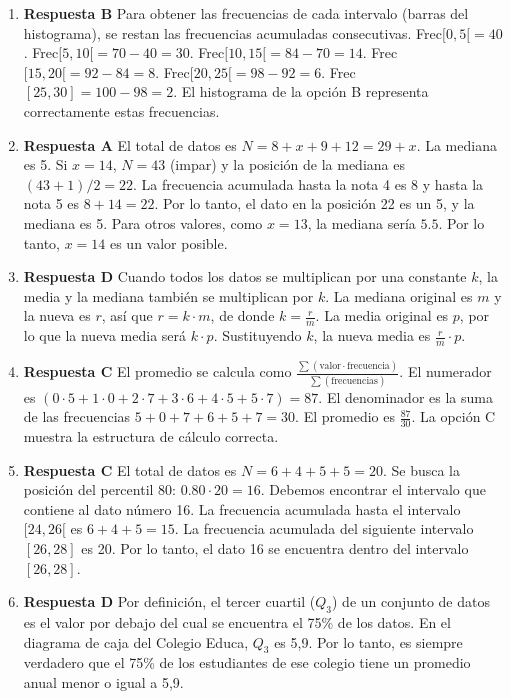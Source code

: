 \documentclass[11pt]{article}
\begin{document}
\begin{enumerate}
    \item \textbf{Respuesta B} Para obtener las frecuencias de cada intervalo (barras del histograma), se restan las frecuencias acumuladas consecutivas. Frec$[0,5[ = 40$. Frec$[5,10[ = 70-40=30$. Frec$[10,15[ = 84-70=14$. Frec$[15,20[ = 92-84=8$. Frec$[20,25[ = 98-92=6$. Frec$[25,30] = 100-98=2$. El histograma de la opción B representa correctamente estas frecuencias. %
    
    \item \textbf{Respuesta A} El total de datos es $N = 8+x+9+12 = 29+x$. La mediana es 5. Si $x=14$, $N=43$ (impar) y la posición de la mediana es $(43+1)/2 = 22$. La frecuencia acumulada hasta la nota 4 es 8 y hasta la nota 5 es $8+14=22$. Por lo tanto, el dato en la posición 22 es un 5, y la mediana es 5. Para otros valores, como $x=13$, la mediana sería $5.5$. Por lo tanto, $x=14$ es un valor posible. %

    \item \textbf{Respuesta D} Cuando todos los datos se multiplican por una constante $k$, la media y la mediana también se multiplican por $k$. La mediana original es $m$ y la nueva es $r$, así que $r = k \cdot m$, de donde $k = \frac{r}{m}$. La media original es $p$, por lo que la nueva media será $k \cdot p$. Sustituyendo $k$, la nueva media es $\frac{r}{m} \cdot p$. %

    \item \textbf{Respuesta C} El promedio se calcula como $\frac{\sum(\text{valor} \cdot \text{frecuencia})}{\sum(\text{frecuencias})}$. El numerador es $(0\cdot5 + 1\cdot0 + 2\cdot7 + 3\cdot6 + 4\cdot5 + 5\cdot7) = 87$. El denominador es la suma de las frecuencias $5+0+7+6+5+7 = 30$. El promedio es $\frac{87}{30}$. La opción C muestra la estructura de cálculo correcta. %
    
    \item \textbf{Respuesta C} El total de datos es $N=6+4+5+5=20$. Se busca la posición del percentil 80: $0.80 \cdot 20 = 16$. Debemos encontrar el intervalo que contiene al dato número 16. La frecuencia acumulada hasta el intervalo $[24, 26[$ es $6+4+5=15$. La frecuencia acumulada del siguiente intervalo $[26, 28]$ es 20. Por lo tanto, el dato 16 se encuentra dentro del intervalo $[26, 28]$. %
    
    \item \textbf{Respuesta D} Por definición, el tercer cuartil ($Q_3$) de un conjunto de datos es el valor por debajo del cual se encuentra el 75\% de los datos. En el diagrama de caja del Colegio Educa, $Q_3$ es 5,9. Por lo tanto, es siempre verdadero que el 75\% de los estudiantes de ese colegio tiene un promedio anual menor o igual a 5,9. %
    

\end{enumerate}
\end{document}

